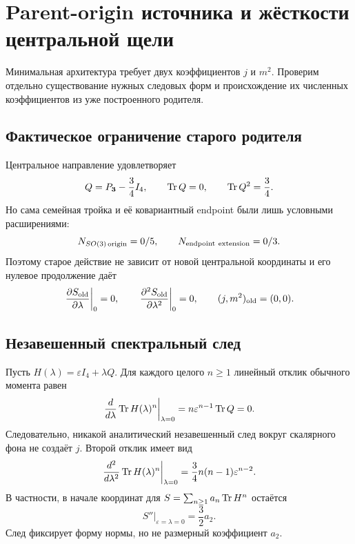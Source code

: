 \chapter{Parent-origin источника и жёсткости центральной щели}
\label{ch:v8-baryon-c0-singlet-triplet-central-gap-source-stiffness-parent-origin-gate}

Минимальная архитектура требует двух коэффициентов $j$ и $m^2$.
Проверим отдельно существование нужных следовых форм и происхождение их
численных коэффициентов из уже построенного родителя.

\section{Фактическое ограничение старого родителя}

Центральное направление удовлетворяет
\begin{equation}
 Q=P_{\mathbf3}-\frac34I_4,
 \qquad \operatorname{Tr} Q=0,
 \qquad \operatorname{Tr} Q^2=\frac34.
 \label{eq:v8-baryon-c0-gap-origin-q-invariants}
\end{equation}
Но сама семейная тройка и её ковариантный endpoint были лишь условными
расширениями:
\begin{equation}
 N_{SO(3)\,\rm origin}=0/5,
 \qquad N_{\rm endpoint\ extension}=0/3.
 \label{eq:v8-baryon-c0-gap-origin-missing-endpoint-ledgers}
\end{equation}
Поэтому старое действие не зависит от новой центральной координаты и его
нулевое продолжение даёт
\begin{equation}
 \left.\frac{\partial S_{\rm old}}{\partial\lambda}\right|_0=0,
 \qquad
 \left.\frac{\partial^2S_{\rm old}}{\partial\lambda^2}\right|_0=0,
 \qquad (j,m^2)_{\rm old}=(0,0).
 \label{eq:v8-baryon-c0-gap-origin-old-parent-zero-restriction}
\end{equation}

\section{Незавешенный спектральный след}

Пусть $H(\lambda)=\varepsilon I_4+\lambda Q$. Для каждого целого $n\geq1$
линейный отклик обычного момента равен
\begin{equation}
 \left.\frac{d}{d\lambda}\operatorname{Tr} H(\lambda)^n\right|_{\lambda=0}
 =n\varepsilon^{n-1}\operatorname{Tr} Q=0.
 \label{eq:v8-baryon-c0-gap-origin-unmarked-moment-no-source}
\end{equation}
Следовательно, никакой аналитический незавешенный след вокруг скалярного
фона не создаёт $j$. Второй отклик имеет вид
\begin{equation}
 \left.\frac{d^2}{d\lambda^2}\operatorname{Tr} H(\lambda)^n\right|_{\lambda=0}
 =\frac34n(n-1)\varepsilon^{n-2}.
 \label{eq:v8-baryon-c0-gap-origin-unmarked-moment-curvature}
\end{equation}
В частности, в начале координат для
$S=\sum_{n\geq1}a_n\operatorname{Tr} H^n$ остаётся
\begin{equation}
 \left.S''\right|_{\varepsilon=\lambda=0}=\frac32a_2.
 \label{eq:v8-baryon-c0-gap-origin-quadratic-trace-stiffness}
\end{equation}
След фиксирует форму нормы, но не размерный коэффициент $a_2$.

